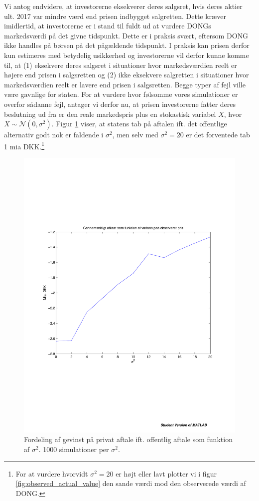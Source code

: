 \documentclass{article}
\begin{document}
 Vi antog endvidere, at investorerne eksekverer deres salgsret, hvis deres aktier ult. 2017 var mindre værd end prisen indbygget salgretten. Dette kræver imidlertid, at investorerne er i stand til fuldt ud at vurdere DONGs markedsværdi på det givne tidspunkt. Dette er i praksis svært, eftersom DONG ikke handles på børsen på det pågældende tidspunkt. I praksis kan prisen derfor kun estimeres med betydelig usikkerhed og  investorerne vil derfor kunne komme til, at (1) eksekvere deres salgsret i situationer hvor markedsværdien reelt er højere end prisen i salgsretten og (2) ikke eksekvere salgretten i situationer hvor markedsværdien reelt er lavere end prisen i salgsretten. Begge typer af fejl ville være gavnlige for staten. For at vurdere hvor følsomme vores simulationer er overfor sådanne fejl, antager vi derfor nu, at prisen investorerne fatter deres beslutning ud fra er den reale markedspris plus en stokastisk variabel $X$, hvor $X \sim \mathcal{N}(0, \sigma^2)$. Figur \ref{fig:usikkerhed} viser, at statens tab på aftalen ift. det offentlige alternativ godt nok er faldende i $\sigma^2$, men selv med $\sigma^2=20$ er det forventede tab 1 mia DKK.\footnote{For at vurdere hvorvidt $\sigma^2=20$ er højt eller lavt plotter vi i figur \ref{fig:observed_actual_value} den sande værdi mod den observerede værdi af DONG.}
 
 \begin{figure}
\includegraphics[scale=0.8]{../matlab/figs/return_variance}
\caption{Fordeling af gevinst p\aa{} privat aftale ift. offentlig aftale som funktion af $\sigma^2$. 1000 simulationer per $\sigma^2$. }
\label{fig:usikkerhed}
\end{figure}
\end{document}
